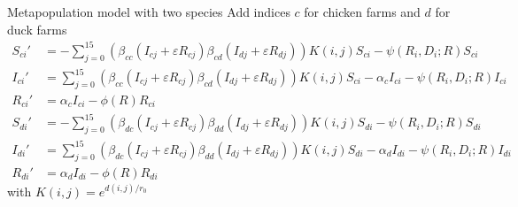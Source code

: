 \documentclass[aspectratio=43]{beamer}
\begin{document}
\begin{frame}{Metapopulation model with two species}
	Add indices $c$ for chicken farms and $d$ for duck farms
	\footnotesize
	\begin{align*}
		S_{ci}' &= -\sum_{j=0}^{15}
		\left(
			\beta_{cc}(I_{cj}+\varepsilon R_{cj})
			\beta_{cd}(I_{dj}+\varepsilon R_{dj})
		\right)K(i,j)S_{ci}
		-\psi(R_i,D_i;R)S_{ci} \\
		I_{ci}' &= \sum_{j=0}^{15}
		\left(
			\beta_{cc}(I_{cj}+\varepsilon R_{cj})
			\beta_{cd}(I_{dj}+\varepsilon R_{dj})
		\right)K(i,j)S_{ci}
		-\alpha_c I_{ci}-\psi(R_i,D_i;R)I_{ci} \\
		R_{ci}' &= \alpha_c I_{ci}-\phi(R)R_{ci} \\
		S_{di}' &= -\sum_{j=0}^{15}
		\left(
			\beta_{dc}(I_{cj}+\varepsilon R_{cj})
			\beta_{dd}(I_{dj}+\varepsilon R_{dj})
		\right)K(i,j)S_{di}
		-\psi(R_i,D_i;R)S_{di} \\
		I_{di}' &= \sum_{j=0}^{15}
		\left(
			\beta_{dc}(I_{cj}+\varepsilon R_{cj})
			\beta_{dd}(I_{dj}+\varepsilon R_{dj})
		\right)K(i,j)S_{di}
		-\alpha_d I_{di}-\psi(R_i,D_i;R)I_{di} \\
		R_{di}' &= \alpha_d I_{di}-\phi(R)R_{di}
	\end{align*}
	with $K(i,j)=e^{d(i,j)/r_0}$
\end{frame}

\end{document}
